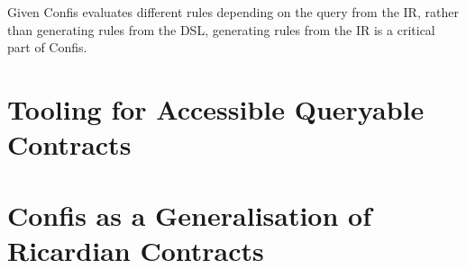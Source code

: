 Given Confis evaluates different rules depending on the query from the IR, rather than generating rules from the DSL, generating rules from the IR is a critical part of Confis.





\section{Tooling for Accessible Queryable Contracts}\label{sec:tooling-for-accessible-queryable-contracts}

\section{Confis as a Generalisation of Ricardian Contracts}\label{sec:generalisation-of-ricardian-contracts}
